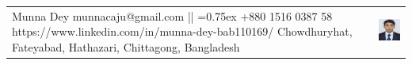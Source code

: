 \documentclass{resume}
\begin{document}
\selectfont

\noindent
\newline
\begin{tabularx}{\linewidth}{@{}m{} m{}@{}}
{
    \Large{Munna Dey} \newline
    \small{
   		{munnacaju@gmail.com} || {\fontdimen2\font=0.75ex +880 1516 0387 58 } 
            \newline
            {https://www.linkedin.com/in/munna-dey-bab110169/}
         \newline
        Chowdhuryhat, Fateyabad, Hathazari, Chittagong, Bangladesh
    }
} & 
{
    \hfill
    \includegraphics[width=3cm]{images/image.jpg}
}
\end{tabularx}
\end{document}
